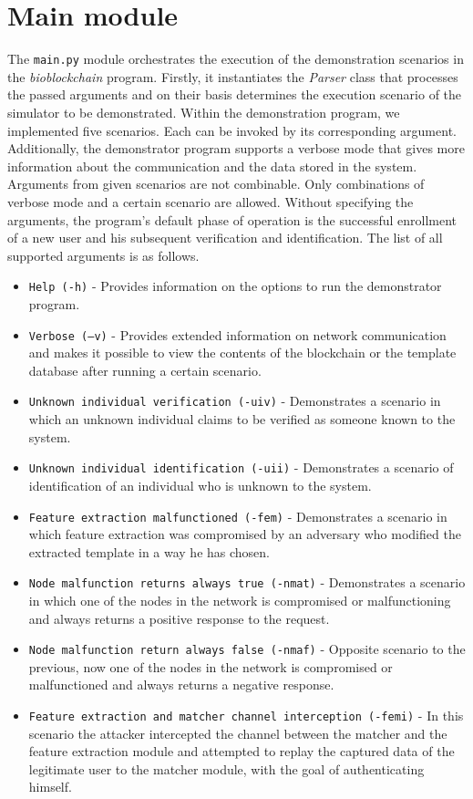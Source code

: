 \section{Main module}
\label{Main module}
The \texttt{main.py} module orchestrates the execution of the demonstration scenarios in the \emph{bioblockchain} program. Firstly, it instantiates the \emph{Parser} class that processes the passed arguments and on their basis determines the execution scenario of the simulator to be demonstrated. Within the demonstration program, we implemented five scenarios. Each can be invoked by its corresponding argument. Additionally, the demonstrator program supports a verbose mode that gives more information about the communication and the data stored in the system. Arguments from given scenarios are not combinable. Only combinations of verbose mode and a certain scenario are allowed. Without specifying the arguments, the program's default phase of operation is the successful enrollment of a new user and his subsequent verification and identification. The list of all supported arguments is as follows.
\begin{itemize}
    \item \texttt{Help (-h)} - Provides information on the options to run the demonstrator program. 
    \item \texttt{Verbose (--v)} - Provides extended information on network communication and makes it possible to view the contents of the blockchain or the template database after running a certain scenario.
    \item \texttt{Unknown individual verification (-uiv)} - Demonstrates a scenario in which an unknown individual claims to be verified as someone known to the system.
    \item \texttt{Unknown individual identification (-uii)} - Demonstrates a scenario of identification of an individual who is unknown to the system.
    \item \texttt{Feature extraction malfunctioned (-fem)} - Demonstrates a scenario in which feature extraction was compromised by an adversary who modified the extracted template in a way he has chosen.
    \item \texttt{Node malfunction returns always true (-nmat)} - Demonstrates a scenario in which one of the nodes in the network is compromised or malfunctioning and always returns a positive response to the request.
    \item \texttt{Node malfunction return always false (-nmaf)} - Opposite scenario to the previous, now one of the nodes in the network is compromised or malfunctioned and always returns a negative response.
    \item \texttt{Feature extraction and matcher channel interception (-femi)} - In this scenario the attacker intercepted the channel between the matcher and the feature extraction module and attempted to replay the captured data of the legitimate user to the matcher module, with the goal of authenticating himself.

\end{itemize}
